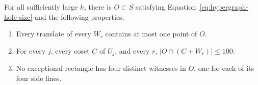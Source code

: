 \begin{lemma}\label{lem:hypergraph-holes}
For all sufficiently large $h$, there is $O\subset S$ satisfying
Equation~\eqref{eq:hypergraph-hole-size} and the following properties.
\begin{enumerate}[label=\textup{(\roman*)}]
 \item Every translate of every $W_r$ contains at most one point of $O$.
 \item For every $j$, every coset $C$ of $U_j$, and every $r$,
       $|O\cap(C+W_r)|\le100$.
 \item No exceptional rectangle has four distinct witnesses in $O$,
       one for each of its four side lines.
\end{enumerate}
\end{lemma}

